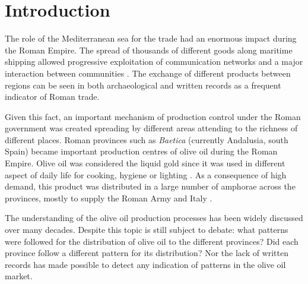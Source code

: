 \documentclass[review]{elsarticle}
\newcommand{\memo}[2]{\textcolor{#1}{#2}}
\newcommand{\xavi}[1]{\memo{magenta}{XRC: #1\\}}
\begin{document}
\section{Introduction}

The role of the Mediterranean sea for the trade had an enormous impact during the Roman Empire. The spread of thousands of different goods along maritime shipping allowed progressive exploitation of communication networks and a major interaction between communities \citep{rodriguez_baetican_1998, 
temin_market_2001,
bevan_mediterranean_2014}. The exchange of different products between regions can be seen in both archaeological and written records as a frequent indicator of Roman trade.  


Given this fact, an important mechanism of production control under the Roman government was created spreading by different areas attending to the richness of different places. Roman provinces such as \textit{Baetica} (currently Andalusia, south Spain) became important production centres of olive oil during the Roman Empire. Olive oil was considered the liquid gold since it was used in different aspect of daily life for cooking, hygiene or lighting  \citep{mattingly_d.j._oil_1988}. As a consequence of high demand, this product was distributed in a large number of amphorae across the provinces, mostly to supply the Roman Army and Italy \citep{blazquez_exportacion_1980}. 


The understanding of the olive oil production processes has been widely discussed over many decades\citep{rodriguez_economioleicola_1977, Chic_hispania_1997,millet_anforas_1998}. Despite this topic is still subject to debate: what patterns were followed for the distribution of olive oil to the different provinces?
Did each province follow a different pattern for its distribution? Nor the lack of written records has made possible to detect any indication of patterns in the olive oil market.
\end{document}
